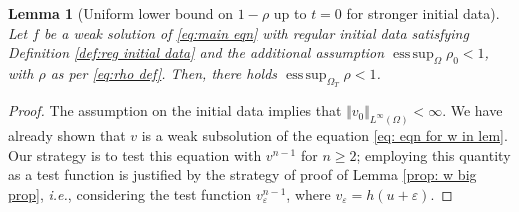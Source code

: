 \documentclass[11pt,a4paper,reqno]{amsart}
\newtheorem{lemma}[prop]{Lemma}
\theoremstyle{remark}
\theoremstyle{definition}
\numberwithin{equation}{section}
\DeclareMathOperator{\esssup}{ess \, sup}
\begin{document}
\begin{lemma}[Uniform lower bound on $1-\rho$ up to $t=0$ for stronger initial data]\label{lem:unif lower bound for stronger initial data}
    Let $f$ be a weak solution of \eqref{eq:main eqn} with regular initial data satisfying Definition \ref{def:reg initial data} and the additional assumption $\esssup_\Omega \rho_0 < 1$, with $\rho$ as per \eqref{eq:rho def}. Then, there holds $\esssup_{\Omega_T} \rho < 1$. 
    \end{lemma}
\begin{proof}
The assumption on the initial data implies that $\Vert v_0 \Vert_{L^\infty(\Omega)} < \infty$. We have already shown that $v$ is a weak subsolution of the equation \eqref{eq: eqn for w in lem}. Our strategy is to test this equation with $v^{n-1}$ for $n \geq 2$; employing this quantity as a test function is justified by the strategy of proof of Lemma \ref{prop: w big prop}, \textit{i.e.}, considering the test function $v_\varepsilon^{n-1}$, where $v_\varepsilon=h(u+\varepsilon)$. 


\end{proof}
\end{document}
